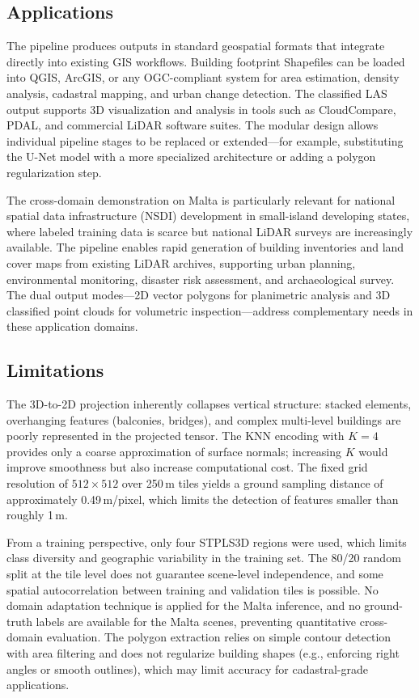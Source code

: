 \documentclass[11pt]{article}
\begin{document}
\subsection{Applications}
\label{sec:discussion_applications}

The pipeline produces outputs in standard geospatial formats that integrate directly into existing GIS workflows.
Building footprint Shapefiles can be loaded into QGIS, ArcGIS, or any OGC-compliant system for area estimation, density analysis, cadastral mapping, and urban change detection.
The classified LAS output supports 3D visualization and analysis in tools such as CloudCompare, PDAL, and commercial LiDAR software suites.
The modular design allows individual pipeline stages to be replaced or extended---for example, substituting the U-Net model with a more specialized architecture or adding a polygon regularization step.

The cross-domain demonstration on Malta is particularly relevant for national spatial data infrastructure (NSDI) development in small-island developing states, where labeled training data is scarce but national LiDAR surveys are increasingly available.
The pipeline enables rapid generation of building inventories and land cover maps from existing LiDAR archives, supporting urban planning, environmental monitoring, disaster risk assessment, and archaeological survey.
The dual output modes---2D vector polygons for planimetric analysis and 3D classified point clouds for volumetric inspection---address complementary needs in these application domains.

\subsection{Limitations}
\label{sec:discussion_limitations}

The 3D-to-2D projection inherently collapses vertical structure: stacked elements, overhanging features (balconies, bridges), and complex multi-level buildings are poorly represented in the projected tensor.
The KNN encoding with $K = 4$ provides only a coarse approximation of surface normals; increasing $K$ would improve smoothness but also increase computational cost.
The fixed grid resolution of $512 \times 512$ over 250\,m tiles yields a ground sampling distance of approximately 0.49\,m/pixel, which limits the detection of features smaller than roughly 1\,m.

From a training perspective, only four STPLS3D regions were used, which limits class diversity and geographic variability in the training set.
The 80/20 random split at the tile level does not guarantee scene-level independence, and some spatial autocorrelation between training and validation tiles is possible.
No domain adaptation technique is applied for the Malta inference, and no ground-truth labels are available for the Malta scenes, preventing quantitative cross-domain evaluation.
The polygon extraction relies on simple contour detection with area filtering and does not regularize building shapes (e.g., enforcing right angles or smooth outlines), which may limit accuracy for cadastral-grade applications.
\end{document}
